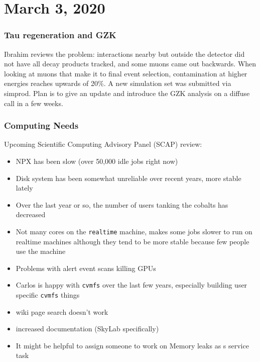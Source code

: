 \chapter{March 3, 2020}


\subsection*{\textbf{Tau regeneration and GZK}}
Ibrahim reviews the problem: interactions nearby but outside the detector did not have all decay products tracked, and some muons came out backwards. When looking at muons that make it to final event selection, contamination at higher energies reaches upwards of 20\%. A new simulation set was submitted via simprod. Plan is to give an update and introduce the GZK analysis on a diffuse call in a few weeks.

\subsection*{\textbf{Computing Needs}}
Upcoming Scientific Computing Advisory Panel (SCAP) review: 
\begin{itemize}
    \itemsep-1em
    \item NPX has been slow (over 50,000 idle jobs right now)
    \item Disk system has been somewhat unreliable over recent years, more stable lately
    \item Over the last year or so, the number of users tanking the cobalts has decreased
    \item Not many cores on the \texttt{realtime} machine, makes some jobs slower to run on realtime machines although they tend to be more stable because few people use the machine
    \item Problems with alert event scans killing GPUs
    \item Carlos is happy with \texttt{cvmfs} over the last few years, especially building user specific \texttt{cvmfs} things
    \item wiki page search doesn't work
    \item increased documentation (SkyLab specifically)
    \item It might be helpful to assign someone to work on Memory leaks as s service task
\end{itemize}

